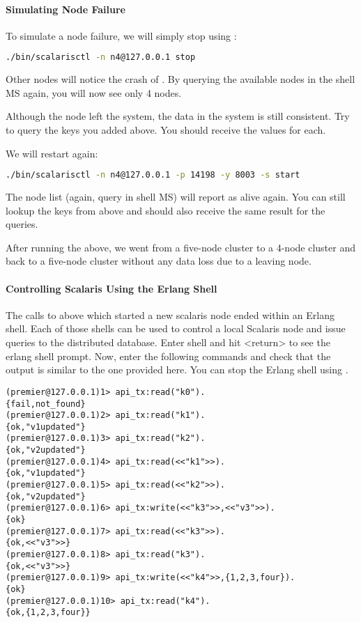 \paragraph{Simulating Node Failure}
To simulate a node failure, we will simply stop  using :

\begin{lstlisting}[language=sh]
./bin/scalarisctl -n n4@127.0.0.1 stop
\end{lstlisting}

Other nodes will notice the crash of . By querying the available nodes in the
shell MS again, you will now see only 4 nodes.

Although the node  left the system, the data in the system is still consistent.
Try to query the keys you added above. You should receive the values for each.

We will restart  again:
\begin{lstlisting}[language=sh]
./bin/scalarisctl -n n4@127.0.0.1 -p 14198 -y 8003 -s start
\end{lstlisting}

The node list (again, query  in shell MS) will report  as alive
again. You can still lookup the keys from above and should also receive the same result
for the queries.

After running the above, we went from a five-node cluster to a 4-node cluster and back to
a five-node cluster without any data loss due to a leaving node.

\paragraph{Controlling Scalaris Using the Erlang Shell}
The calls to  above which started a new scalaris node ended within an
Erlang shell. Each of those shells can be used to control a local Scalaris node and issue
queries to the distributed database. Enter shell  and hit <return> to see the
erlang shell prompt. Now, enter the following commands and check that the output is
similar to the one provided here. You can stop the Erlang shell using .

\begin{lstlisting}
(premier@127.0.0.1)1> api_tx:read("k0").
{fail,not_found}
(premier@127.0.0.1)2> api_tx:read("k1").
{ok,"v1updated"}
(premier@127.0.0.1)3> api_tx:read("k2").
{ok,"v2updated"}
(premier@127.0.0.1)4> api_tx:read(<<"k1">>).
{ok,"v1updated"}
(premier@127.0.0.1)5> api_tx:read(<<"k2">>).
{ok,"v2updated"}
(premier@127.0.0.1)6> api_tx:write(<<"k3">>,<<"v3">>). 
{ok}
(premier@127.0.0.1)7> api_tx:read(<<"k3">>).           
{ok,<<"v3">>}
(premier@127.0.0.1)8> api_tx:read("k3").    
{ok,<<"v3">>}
(premier@127.0.0.1)9> api_tx:write(<<"k4">>,{1,2,3,four}).
{ok}
(premier@127.0.0.1)10> api_tx:read("k4").                  
{ok,{1,2,3,four}}
\end{lstlisting}

